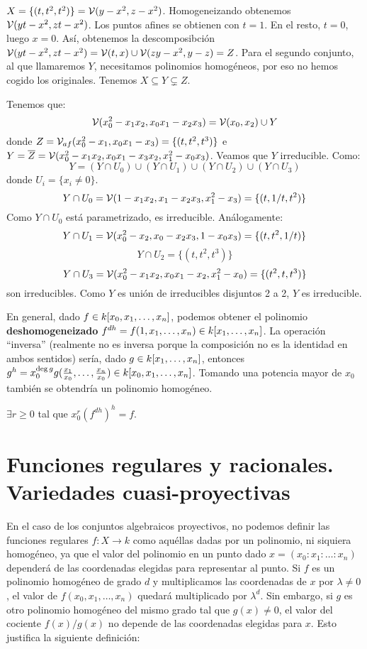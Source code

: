 \documentclass[ACGA.tex]{subfiles}
\begin{document}
\begin{ej}
$X=\{(t,t^2,t^2)\}=\mathcal{V}(y-x^2,z-x^2)$. Homogeneizando obtenemos $\mathcal{V}(yt-x^2,zt-x^2)$. Los puntos afines se obtienen con $t=1$. En el resto, $t=0$, luego $x=0$. Así, obtenemos la descomposibción $\mathcal{V}(yt-x^2,zt-x^2)=\mathcal{V}(t,x)\cup\mathcal{V}(zy-x^2,y-z)=Z$. Para el segundo conjunto, al que llamaremos $Y$, necesitamos polinomios homogéneos, por eso no hemos cogido los originales. Tenemos $X\subseteq Y\subsetneq Z$. 

Tenemos que:
\[ \mathcal{V}(x_0^2-x_1x_2, x_0x_1-x_2x_3) = \mathcal{V}(x_0,x_2) \cup Y \]
donde $Z=\mathcal{V}_{af}(x_0^2-x_1,x_0x_1-x_3) = \{(t,t^2,t^3)\}$ e $Y=\overline{Z}=\mathcal{V}(x_0^2-x_1x_2,x_0x_1-x_3x_2,x_1^2-x_0x_3)$. Veamos que $Y$ irreducible. Como:
\[ Y = (Y \cap U_0) \cup (Y \cap U_1) \cup (Y \cap U_2) \cup (Y \cap U_3) \]
donde $U_i = \{x_i \neq 0\}$.
\[ Y \cap U_0 = \mathcal{V}(1-x_1x_2,x_1-x_2x_3,x_1^2-x_3) = \{(t,1/t,t^2)\} \]
Como $Y \cap U_0$ está parametrizado, es irreducible. Análogamente:
\[ Y \cap U_1 = \mathcal{V}(x_0^2-x_2,x_0-x_2x_3,1-x_0x_3) = \{(t,t^2,1/t)\} \]
\[ Y \cap U_2 = \{(t,t^2,t^3)\} \]
\[ Y \cap U_3 = \mathcal{V}(x_0^2-x_1x_2, x_0x_1-x_2, x_1^2-x_0) = \{(t^2,t,t^3)\} \]
son irreducibles. Como $Y$ es unión de irreducibles disjuntos 2 a 2, $Y$ es irreducible.
\end{ej}

\begin{nota}
En general, dado $f\in k[x_0,x_1,\dotsc,x_{n}]$, podemos obtener el polinomio \textbf{deshomogeneizado} $f^{dh}=f(1,x_1,\dots,x_n)\in k[x_1,\dotsc,x_{n}]$. La operación ``inversa'' (realmente no es inversa porque la composición no es la identidad en ambos sentidos) sería, dado $g\in k[x_1,\dotsc,x_{n}]$, entonces $g^h=x_0^{\deg{g}}g(\frac{x_1}{x_0},\dots,\frac{x_n}{x_0})\in k[x_0,x_1,\dotsc,x_{n}]$. Tomando una potencia mayor de $x_0$ también se obtendría un polinomio homogéneo. 
\end{nota}

\begin{ejer}
$\exists r\geq 0$ tal que $x_0^r(f^{dh})^h=f$.
\end{ejer}

\section{Funciones regulares y racionales. Variedades cuasi-proyectivas}

En el caso de los conjuntos algebraicos proyectivos, no podemos definir las funciones regulares $f:X\to k$ como aquéllas dadas por un polinomio, ni siquiera homogéneo, ya que el valor del polinomio en un punto dado $x=(x_0:x_1:\ldots:x_n)$ dependerá de las coordenadas elegidas para representar al punto. Si $f$ es un polinomio homogéneo de grado $d$ y multiplicamos las coordenadas de $x$ por $\lambda\neq 0$, el valor de $f(x_0,x_1,\ldots,x_n)$ quedará multiplicado por $\lambda^ d$. Sin embargo, si $g$ es otro polinomio homogéneo del mismo grado tal que $g(x)\neq 0$, el valor del cociente $f(x)/g(x)$ no depende de las coordenadas elegidas para $x$. Esto justifica la siguiente definición:
\end{document}
